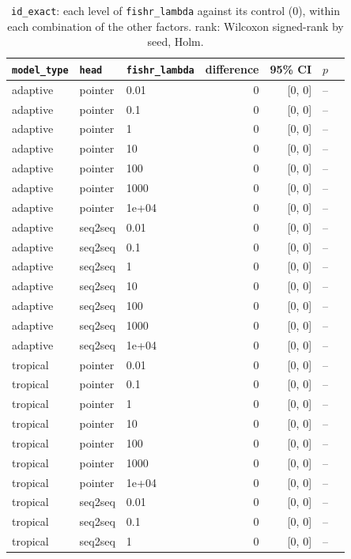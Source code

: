 \documentclass[10pt]{article}
\begin{document}
{\small
\begin{longtable}{lllrrrl}
\caption{\texttt{id\_exact}: each level of \texttt{fishr\_lambda} against its control (0), within each combination of the other factors. rank: Wilcoxon signed-rank by seed, Holm.}\label{tab:control-id_exact}\\
\toprule
\texttt{model\_type} & \texttt{head} & \texttt{fishr\_lambda} & difference & 95\% CI & $p$ & \\
\midrule
\endhead
adaptive & pointer & 0.01 & 0 & [0, 0] & -- & \\
adaptive & pointer & 0.1 & 0 & [0, 0] & -- & \\
adaptive & pointer & 1 & 0 & [0, 0] & -- & \\
adaptive & pointer & 10 & 0 & [0, 0] & -- & \\
adaptive & pointer & 100 & 0 & [0, 0] & -- & \\
adaptive & pointer & 1000 & 0 & [0, 0] & -- & \\
adaptive & pointer & 1e+04 & 0 & [0, 0] & -- & \\
adaptive & seq2seq & 0.01 & 0 & [0, 0] & -- & \\
adaptive & seq2seq & 0.1 & 0 & [0, 0] & -- & \\
adaptive & seq2seq & 1 & 0 & [0, 0] & -- & \\
adaptive & seq2seq & 10 & 0 & [0, 0] & -- & \\
adaptive & seq2seq & 100 & 0 & [0, 0] & -- & \\
adaptive & seq2seq & 1000 & 0 & [0, 0] & -- & \\
adaptive & seq2seq & 1e+04 & 0 & [0, 0] & -- & \\
tropical & pointer & 0.01 & 0 & [0, 0] & -- & \\
tropical & pointer & 0.1 & 0 & [0, 0] & -- & \\
tropical & pointer & 1 & 0 & [0, 0] & -- & \\
tropical & pointer & 10 & 0 & [0, 0] & -- & \\
tropical & pointer & 100 & 0 & [0, 0] & -- & \\
tropical & pointer & 1000 & 0 & [0, 0] & -- & \\
tropical & pointer & 1e+04 & 0 & [0, 0] & -- & \\
tropical & seq2seq & 0.01 & 0 & [0, 0] & -- & \\
tropical & seq2seq & 0.1 & 0 & [0, 0] & -- & \\
tropical & seq2seq & 1 & 0 & [0, 0] & -- & \\

\end{longtable}}
\end{document}
